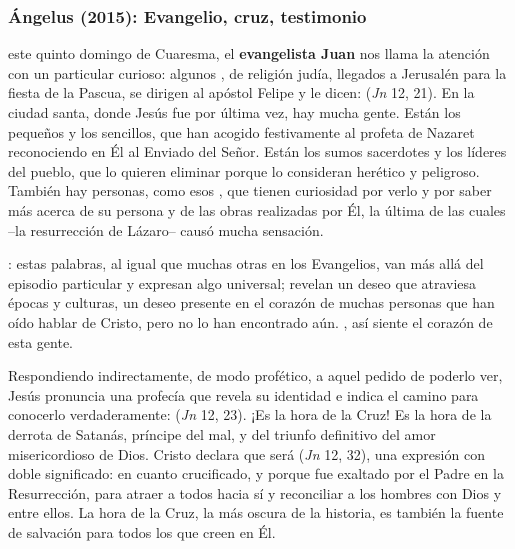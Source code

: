 \subsubsection{Ángelus (2015): Evangelio, cruz, testimonio}


\begin{body}
 este quinto domingo de Cuaresma, el \textbf{evangelista Juan} nos llama la atención con un particular curioso: algunos , de religión judía, llegados a Jerusalén para la fiesta de la Pascua, se dirigen al apóstol Felipe y le dicen:  (\textit{Jn} 12, 21). En la ciudad santa, donde Jesús fue por última vez, hay mucha gente. Están los pequeños y los sencillos, que han acogido festivamente al profeta de Nazaret reconociendo en Él al Enviado del Señor. Están los sumos sacerdotes y los líderes del pueblo, que lo quieren eliminar porque lo consideran herético y peligroso. También hay personas, como esos , que tienen curiosidad por verlo y por saber más acerca de su persona y de las obras realizadas por Él, la última de las cuales –la resurrección de Lázaro– causó mucha sensación.

: estas palabras, al igual que muchas otras en los Evangelios, van más allá del episodio particular y expresan algo universal; revelan un deseo que atraviesa épocas y culturas, un deseo presente en el corazón de muchas personas que han oído hablar de Cristo, pero no lo han encontrado aún. , así siente el corazón de esta gente.

Respondiendo indirectamente, de modo profético, a aquel pedido de poderlo ver, Jesús pronuncia una profecía que revela su identidad e indica el camino para conocerlo verdaderamente:  (\textit{Jn} 12, 23). ¡Es la hora de la Cruz! Es la hora de la derrota de Satanás, príncipe del mal, y del triunfo definitivo del amor misericordioso de Dios. Cristo declara que será  (\textit{Jn} 12, 32), una expresión con doble significado:  en cuanto crucificado, y  porque fue exaltado por el Padre en la Resurrección, para atraer a todos hacia sí y reconciliar a los hombres con Dios y entre ellos. La hora de la Cruz, la más oscura de la historia, es también la fuente de salvación para todos los que creen en Él.


\end{body}
